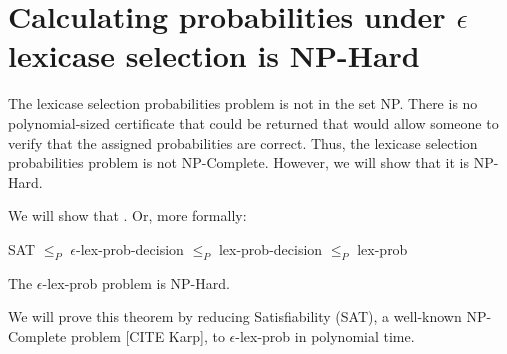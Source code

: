\documentclass[sigconf]{acmart}
\begin{document}
\section{Calculating probabilities under $\epsilon$ lexicase selection is NP-Hard}

The lexicase selection probabilities problem is not in the set NP. There is no polynomial-sized certificate that could be returned that would allow someone to verify that the assigned probabilities are correct. Thus, the lexicase selection probabilities problem is not NP-Complete. However, we will show that it is NP-Hard.

We will show that . Or, more formally:

{\sc SAT} $\leq_{P}$ {\sc $\epsilon$-lex-prob-decision} $\leq_{P}$ {\sc lex-prob-decision} $\leq_{P}$ {\sc lex-prob}

\begin{theorem}
\label{elexicasetheorem}
The {\sc $\epsilon$-lex-prob} problem is NP-Hard.
\end{theorem}

We will prove this theorem by reducing Satisfiability ({\sc SAT}), a well-known NP-Complete problem [CITE Karp], to {\sc $\epsilon$-lex-prob} in polynomial time.
\end{document}
